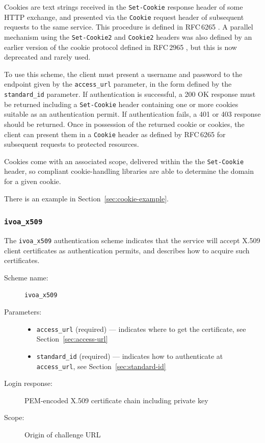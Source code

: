 \documentclass[11pt,a4paper]{ivoa}
\newcommand{\rfc}[1]{RFC\,#1}
\newcommand{\header}[1]{{\tt #1}}
\begin{document}
Cookies are text strings received in the {\tt Set-Cookie}
response header of some HTTP exchange,
and presented via the {\tt Cookie} request header of subsequent
requests to the same service.
This procedure is defined in \rfc{6265} \citep{std:RFC6265}.
A parallel mechanism using the {\tt Set-Cookie2} and {\tt Cookie2}
headers was also defined by an earlier version of the cookie protocol
defined in \rfc{2965} \citep{std:RFC2965},
but this is now deprecated and rarely used.

To use this scheme, the client must present a username and password
to the endpoint given by the \verb|access_url| parameter,
in the form defined by the \verb|standard_id| parameter.
If authentication is successful, a 200 OK response must be returned
including a \header{Set-Cookie} header containing one or more cookies
suitable as an authentication permit.
If authentication fails, a 401 or 403 response should be returned.
Once in possession of the returned cookie or cookies,
the client can present them in a \header{Cookie} header as defined
by \rfc{6265} for subsequent requests to protected resources.

Cookies come with an associated scope, delivered within the
the {\tt Set-Cookie} header, so compliant cookie-handling
libraries are able to determine the domain for a given cookie.

There is an example in Section~\ref{sec:cookie-example}.


\subsubsection{\mbox{\tt ivoa\_x509}}\label{sec:ivoa-x509}

The \verb|ivoa_x509| authentication scheme indicates that the service
will accept X.509 client certificates as authentication permits,
and describes how to acquire such certificates.


\begin{description}
  \item[Scheme name:] \verb|ivoa_x509|
  \item[Parameters:] \mbox{}
  \begin{itemize}
    \item \verb|access_url| (required) ---
          indicates where to get the certificate,
          see Section~\ref{sec:access-url}
    \item \verb|standard_id| (required) ---
          indicates how to authenticate at \verb|access_url|,
          see Section~\ref{sec:standard-id}
  \end{itemize}
  \item[Login response:] PEM-encoded X.509 certificate chain
                         including private key
  \item[Scope:] Origin of challenge URL
\end{description}
\end{document}
